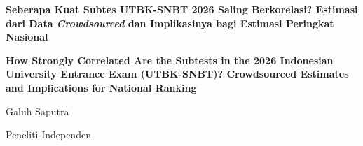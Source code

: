 \documentclass[letterpaper, 12pt]{article}
\begin{document}
\raggedright                         %
\setlength{\parindent}{1.27cm}       %

\vspace*{3\baselineskip}              %
\begin{center}
  {\bfseries\fontsize{12}{15}\selectfont
  Seberapa Kuat Subtes UTBK-SNBT 2026 Saling Berkorelasi? Estimasi dari Data \textit{Crowdsourced} dan Implikasinya bagi Estimasi Peringkat Nasional\par}

  \vspace{2mm}

  \begin{otherlanguage}{english}
    {\bfseries\fontsize{12}{15}\selectfont
    How Strongly Correlated Are the Subtests in the 2026 Indonesian University Entrance Exam (UTBK-SNBT)? Crowdsourced Estimates and Implications for National Ranking\par}
  \end{otherlanguage}

  \vspace{\baselineskip}

  Galuh Saputra\par
  Peneliti Independen\par
\end{center}



\newpage

\newpage










\newpage
\printbibliography[title={Daftar Pustaka}]
\end{document}
